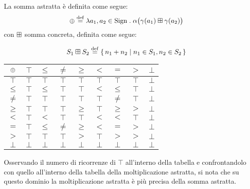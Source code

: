 \begin{definizione}
La somma astratta è definita come segue:
\[
        \absadd \defeq \lambda a_1,a_2 \in \Sign \st \alpha\bigl(\gamma(a_1) \conadd \gamma(a_2)\bigr)
\]
con $\mathbin{\boxplus}$ somma concreta, definita come segue:

\[
        S_1 \conadd S_2 \defeq \{\, n_1 + n_2 \mid n_1 \in S_1, n_2 \in S_2 \,\}
\]
\end{definizione}

\begin{center}
        \begin{tabular}{c | c c c c c c c c}
                $\mathbin{\oplus}$ & $\top$ & $\leq$ & $\neq$ & $\geq$ & $<$ & $=$ & $>$ & $\bot$ \\
                \hline
                $\top$ & $\top$ & $\top$ & $\top$ & $\top$ & $\top$ & $\top$ & $\top$ & $\bot$ \\
                $\leq$ & $\top$ & $\leq$ & $\top$ & $\top$ & $<$ & $\leq$ & $\top$ & $\bot$\\
                $\neq$ & $\top$ & $\top$ & $\top$ & $\top$ & $\top$ & $\neq$ & $\top$ & $\bot$ \\
                $\geq$ & $\top$ & $\top$ & $\top$ & $\geq$ & $\top$ & $\geq$ & $>$ & $\bot$\\
                $<$ & $\top$ & $<$ & $\top$ & $\top$ & $<$ & $<$ & $\top$ & $\bot$\\
                $=$ & $\top$ & $\leq$ & $\neq$ & $\geq$ & $<$ & $=$ & $>$ & $\bot$\\
                $>$ & $\top$ & $\top$ & $\top$ & $>$ & $\top$ & $>$ & $>$ & $\bot$ \\
                $\bot$ & $\bot$ & $\bot$ & $\bot$ & $\bot$ & $\bot$ & $\bot$ & $\bot$ & $\bot$
        \end{tabular}
\end{center}

Osservando il numero di ricorrenze di $\top$ all'interno della tabella
e confrontandolo con quello all'interno della tabella
della moltiplicazione astratta, si nota che su questo dominio
la moltiplicazione astratta è più precisa della somma astratta.

